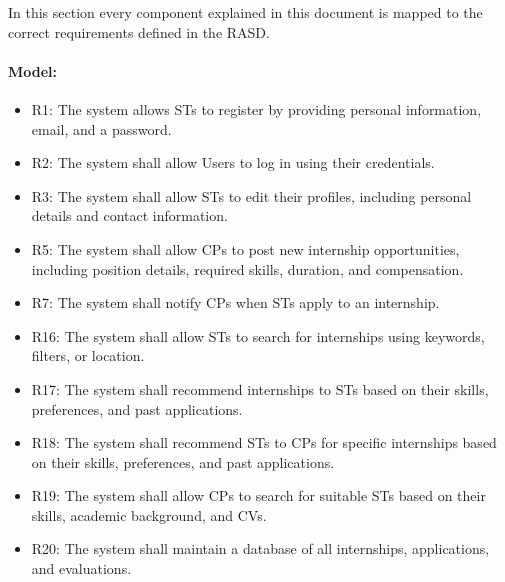 In this section every component explained in this document is mapped to the correct requirements defined in the RASD.

\paragraph{Model:}
\begin{itemize}
    \item R1: The system allows STs to register by providing personal information, email, and a password.
    \item R2: The system shall allow Users to log in using their credentials.
    \item R3: The system shall allow STs to edit their profiles, including personal details and contact information.
    \item R5: The system shall allow CPs to post new internship opportunities, including position details, required skills, duration, and compensation.
    \item R7: The system shall notify CPs when STs apply to an internship.
    \item R16: The system shall allow STs to search for internships using keywords, filters, or location.
    \item R17: The system shall recommend internships to STs based on their skills, preferences, and past applications.
    \item R18: The system shall recommend STs to CPs for specific internships based on their skills, preferences, and past applications.
    \item R19: The system shall allow CPs to search for suitable STs based on their skills, academic background, and CVs.
    \item R20: The system shall maintain a database of all internships, applications, and evaluations.
\end{itemize}

